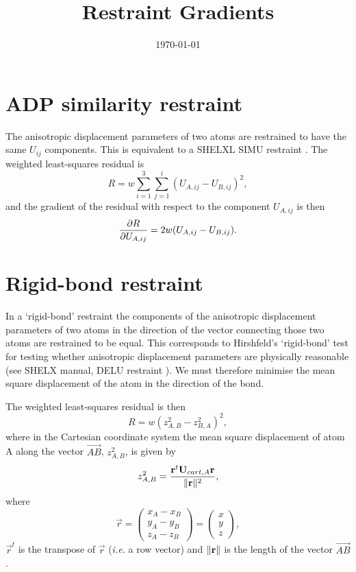 \documentclass[11pt]{article}
\title{Restraint Gradients}
\author{\rjgildea}
\date{\today}
\begin{document}
\maketitle

\section{ADP similarity restraint}
The anisotropic displacement parameters of two atoms are restrained to have the
same $U_{ij}$ components.  This is equivalent to a SHELXL SIMU restraint \cite{SHELX:man97}.
The weighted least-squares residual is
\begin{equation}
R = w \sum_{i=1}^3 \sum_{j=1}^i (U_{A,ij} - U_{B,ij})^2,
\end{equation}
and the gradient of the residual with respect to the component $U_{A,ij}$ is then
\begin{equation}
\frac{\partial R}{\partial U_{A,ij}} = 2w(U_{A,ij} - U_{B,ij}).
\end{equation}

\section{Rigid-bond restraint}

In a `rigid-bond' restraint the components of the anisotropic displacement parameters
of two atoms in the direction of the vector connecting those two atoms are restrained
to be equal.  This corresponds to Hirshfeld's `rigid-bond' test \cite{Hirshfeld:1976} for testing
whether anisotropic displacement parameters are physically reasonable (see SHELX
manual, DELU restraint \cite{SHELX:man97}).  We must therefore minimise the mean square displacement of
the atom in the direction of the bond.

The weighted least-squares residual is then
\begin{equation}
R = w(z^2_{A,B} - z^2_{B,A})^2,
\end{equation}
where in the Cartesian coordinate system the mean square displacement of atom A
along the vector $\overrightarrow{AB}$, $z^2_{A,B}$, is given by
\begin{equation}
z^2_{A,B} = \frac{\mathbf{r}^t\mathbf{U}_{cart,A}\mathbf{r}}{\| \mathbf{r} \|^2},
\end{equation}
where
\begin{equation}
\vec{r} = \begin{pmatrix} x_A - x_B\\y_A - y_B\\z_A - z_B \end{pmatrix}
= \begin{pmatrix} x\\y\\z \end{pmatrix},
\end{equation}
$\vec{r}^t$ is the transpose of $\vec{r}$ (\textit{i.e.} a row vector) and
$\| \mathbf{r} \|$ is the length of the vector $\overrightarrow{AB}$.
\end{document}
